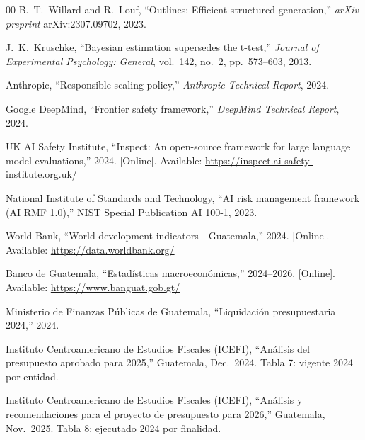 \documentclass[conference]{IEEEtran}
\begin{document}
\begin{thebibliography}{00}
B.~T.~Willard and R.~Louf, ``Outlines: Efficient structured
generation,'' \emph{arXiv preprint} arXiv:2307.09702, 2023.

J.~K.~Kruschke, ``Bayesian estimation supersedes the t-test,''
\emph{Journal of Experimental Psychology: General}, vol.~142, no.~2,
pp.~573--603, 2013.

Anthropic, ``Responsible scaling policy,'' \emph{Anthropic Technical
Report}, 2024.

Google DeepMind, ``Frontier safety framework,'' \emph{DeepMind
Technical Report}, 2024.

UK AI Safety Institute, ``Inspect: An open-source framework for large
language model evaluations,'' 2024.
[Online]. Available: \url{https://inspect.ai-safety-institute.org.uk/}

National Institute of Standards and Technology, ``AI risk management
framework (AI RMF 1.0),'' NIST Special Publication AI 100-1, 2023.

World Bank, ``World development indicators---Guatemala,'' 2024.
[Online]. Available: \url{https://data.worldbank.org/}

Banco de Guatemala, ``Estad\'isticas macroecon\'omicas,'' 2024--2026.
[Online]. Available: \url{https://www.banguat.gob.gt/}

Ministerio de Finanzas P\'ublicas de Guatemala, ``Liquidaci\'on
presupuestaria 2024,'' 2024.

Instituto Centroamericano de Estudios Fiscales (ICEFI),
``An\'alisis del presupuesto aprobado para 2025,'' Guatemala,
Dec.~2024. Tabla 7: vigente 2024 por entidad.

Instituto Centroamericano de Estudios Fiscales (ICEFI),
``An\'alisis y recomendaciones para el proyecto de presupuesto para
2026,'' Guatemala, Nov.~2025. Tabla 8: ejecutado 2024 por finalidad.

\end{thebibliography}
\end{document}
